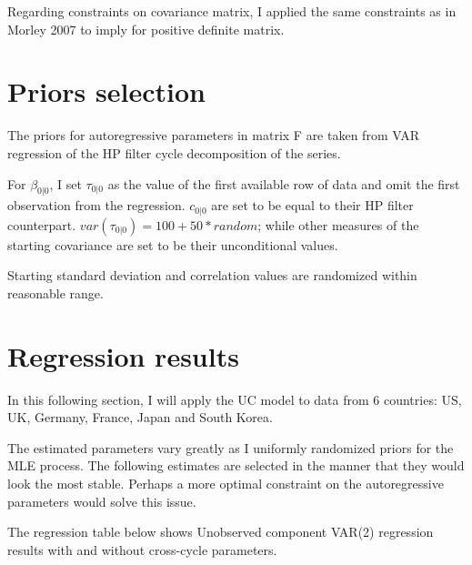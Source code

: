 \documentclass[fleqn]{article}
\begin{document}
\begin{outline}[enumerate]
\vspace{5mm} %

Regarding constraints on covariance matrix, I applied the same constraints as in Morley 2007 to imply for positive definite matrix.


\section{Priors selection}

The priors for autoregressive parameters in matrix F are taken from VAR regression of the HP filter cycle decomposition of the series.

For $\beta_{0|0}$, I set $\tau_{0|0}$ as the value of the first available row of data and omit the first observation from the regression. $c_{0|0}$ are set to be equal to their HP filter counterpart. $var(\tau_{0|0}) =100+50*random$; while other measures of the starting covariance are set to be their unconditional values.

Starting standard deviation and correlation values are randomized within reasonable range.

		
		
		\section{Regression results}
		
		In this following section, I will apply the UC model to data from 6 countries: US, UK, Germany, France, Japan and South Korea.
		
		The estimated parameters vary greatly as I uniformly randomized priors for the MLE process. The following estimates are selected in the manner that they would look the most stable. Perhaps a more optimal constraint on the autoregressive parameters would solve this issue.
		
		The regression table below shows Unobserved component VAR(2) regression results with and without cross-cycle parameters.
		
		\pagebreak
		

\end{outline}
\end{document}
